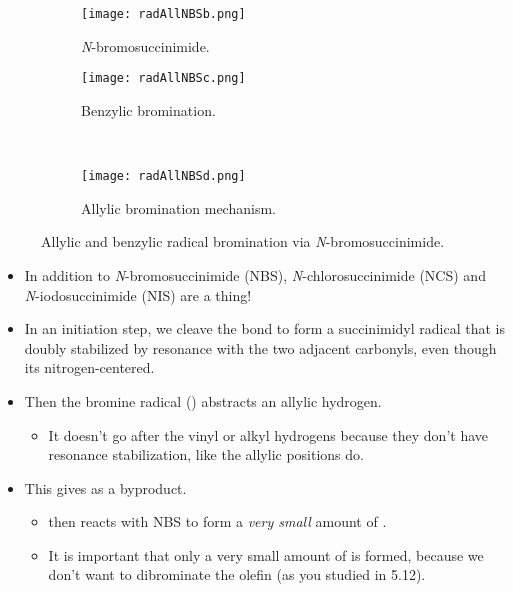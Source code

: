 \documentclass[../notes.tex]{subfiles}
\begin{document}
\begin{itemize}
\begin{figure}[h!]
\begin{subfigure}[b]{0.3\linewidth}
        \end{subfigure}
        \begin{subfigure}[b]{0.3\linewidth}
            \centering
            \texttt{[image: radAllNBSb.png]}
            \caption{\emph{N}-bromosuccinimide.}
            \label{fig:radAllNBSb}
        \end{subfigure}
        \begin{subfigure}[b]{0.3\linewidth}
            \centering
            \texttt{[image: radAllNBSc.png]}
            \caption{Benzylic bromination.}
            \label{fig:radAllNBSc}
        \end{subfigure}\\[2em]
        \begin{subfigure}[b]{\linewidth}
            \centering
            \texttt{[image: radAllNBSd.png]}
            \caption{Allylic bromination mechanism.}
            \label{fig:radAllNBSd}
        \end{subfigure}
        \caption{Allylic and benzylic radical bromination via \emph{N}-bromosuccinimide.}
        \label{fig:radAllNBS}
    \end{figure}
    \begin{itemize}
        \item In addition to \emph{N}-bromosuccinimide (NBS), \emph{N}-chlorosuccinimide (NCS) and \emph{N}-iodosuccinimide (NIS) are a thing!
        \item In an initiation step, we cleave the  bond to form a succinimidyl radical that is doubly stabilized by resonance with the two adjacent carbonyls, even though its nitrogen-centered.
        \item Then the bromine radical () abstracts an allylic hydrogen.
        \begin{itemize}
            \item It doesn't go after the vinyl or alkyl hydrogens because they don't have resonance stabilization, like the allylic positions do.
        \end{itemize}
        \item This gives  as a byproduct.
        \begin{itemize}
            \item {} then reacts with NBS to form a \emph{very small} amount of .
            \item It is important that only a very small amount of  is formed, because we don't want  to dibrominate the olefin (as you studied in 5.12).

\end{itemize}
\end{itemize}
\end{itemize}
\end{document}
